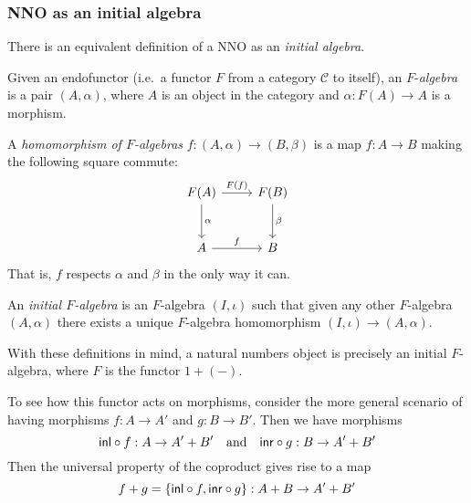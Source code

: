 \documentclass[12pt]{article}
\begin{document}
\subsubsection*{\acs{NNO} as an initial algebra}
There is an equivalent definition of a \acl{NNO} as an \emph{initial algebra}.

Given an endofunctor (i.e.\ a functor $F$ from a category $\mathcal{C}$ to itself), an $F$-\emph{algebra} is a pair $(A, \alpha)$, where $A$ is an object in the category and $\alpha : F(A) \to A$ is a morphism.

A \emph{homomorphism of $F$-algebras} $f : (A, \alpha) \to (B, \beta)$ is a map $f : A \to B$ making the following square commute:
\[
\begin{tikzcd}[column sep=normal,row sep=large]
F(A)\rar{F(f)}\dar{\alpha} & F(B)\dar{\beta}	\\
A\rar{f} & B
\end{tikzcd}
\]
That is, $f$ respects $\alpha$ and $\beta$ in the only way it can.

An \emph{initial $F$-algebra} is an $F$-algebra $(I, \iota)$ such that given any other $F$-algebra $(A, \alpha)$ there exists a unique $F$-algebra homomorphism $(I, \iota) \to (A, \alpha)$.

With these definitions in mind, a natural numbers object is precisely an initial $F$-algebra, where $F$ is the functor $1 + (-)$.

To see how this functor acts on morphisms, consider the more general scenario of having morphisms $f : A \to A'$ and $g : B \to B'$. Then we have morphisms
\begin{equation*}
{\mathsf{inl}} \circ f : A \to A'+B' \quad \text{and} \quad {\mathsf{inr}} \circ g : B \to A' + B'
\end{equation*}
Then the universal property of the coproduct gives rise to a map
\begin{equation*}
f + g = \{ {\mathsf{inl}} \circ f, {\mathsf{inr}} \circ g \} : A+B \to A'+B'
\end{equation*}
\end{document}
